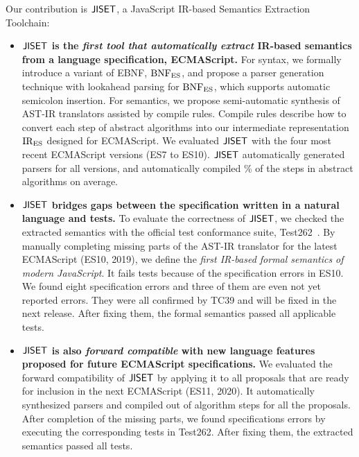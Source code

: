 Our contribution is \( \text{\sf JISET} \), a JavaScript IR-based Semantics Extraction
Toolchain:
\begin{itemize}[leftmargin=0.5cm]
  \item \textbf{\( \text{\sf JISET} \) is the \textit{first tool that automatically
    extract} IR-based semantics from a language specification, ECMAScript.}
    For syntax, we formally introduce a variant of EBNF, \( \text{BNF}_{\text{ES}} \),
    and propose a parser generation technique with
    lookahead parsing for \( \text{BNF}_{\text{ES}} \), which supports automatic semicolon
    insertion. For semantics, we propose semi-automatic synthesis of AST-IR
    translators assisted by compile rules.  Compile rules describe
    how to convert each step of abstract algorithms into our intermediate
    representation \( \text{IR}_\text{ES} \) designed for ECMAScript. We evaluated \( \text{\sf JISET} \)
    with the four most recent ECMAScript versions (ES7 to ES10).   \( \text{\sf JISET} \)
    automatically generated parsers for all versions, and automatically compiled
    \% of the steps in abstract algorithms on average.
  \item \textbf{\( \text{\sf JISET} \) bridges gaps between the specification written in a
    natural language and tests.}
    To evaluate the correctness of \( \text{\sf JISET} \), we checked the extracted
    semantics with the official test conformance suite, Test262~\cite{test262}.
    By manually completing missing parts of the AST-IR translator for the latest
    ECMAScript (ES10, 2019), we define the \textit{first IR-based formal
    semantics of modern JavaScript}. It fails  tests because of the
    specification errors in ES10. We found eight specification errors and
    three of them are even not yet reported errors. They were all confirmed by
    TC39 and will be fixed in the next release.  After fixing them, the formal
    semantics passed all  applicable tests.
  \item \textbf{\( \text{\sf JISET} \) is also \textit{forward compatible} with new
    language features proposed for future ECMAScript specifications.}
    We evaluated the forward compatibility of \( \text{\sf JISET} \) by applying it to all
     proposals that are ready for inclusion in the next ECMAScript
    (ES11, 2020).  It automatically synthesized parsers and compiled 
    out of  algorithm steps for all the proposals.  After completion
    of the missing parts, we found  specifications errors by executing
    the corresponding tests in Test262.  After fixing them, the extracted
    semantics passed all  tests.
\end{itemize}
